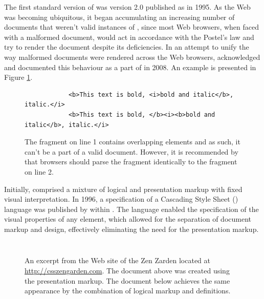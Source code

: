 \documentclass{book}
\begin{document}
        The first standard version of  was version 2.0 published
        as \cite{rfc1866} in 1995. As the Web was becoming ubiquitous, it began
        accumulating an increasing number of documents that weren't valid
        instances of , since most Web browsers, when faced with a
        malformed document, would act in accordance with the Postel's law and
        try to render the document despite its deficiencies. In an attempt to
        unify the way malformed  documents were rendered across
        the Web browsers,  acknowledged and documented this
        behaviour as a part of \cite[Section~8.2, Parsing HTML
        documents]{hickson14} in 2008. An example is presented in Figure
        \ref{fig:overlapping-elements}.

        \begin{figure}[b]
          \begin{verbatim}
            <b>This text is bold, <i>bold and italic</b>, italic.</i>
            <b>This text is bold, </b><i><b>bold and italic</b>, italic.</i>
          \end{verbatim}
          \caption{The fragment on line 1 contains overlapping elements and as
            such, it can't be a part of a valid  document.
            However, it is recommended by  that browsers should
            parse the fragment identically to the fragment on line 2.}
          \label{fig:overlapping-elements}
        \end{figure}

        Initially,  comprised a mixture of logical and
        presentation markup with fixed visual interpretation. In 1996, a
        specification of a Cascading Style Sheet () language was
        published by  within \cite{lie96}. The language enabled
        the specification of the visual properties of any element, which allowed
        for the separation of document markup and design, effectively
        eliminating the need for the presentation markup.

        \begin{figure}
          \inputminted{html}{examples/02/presentation-markup.html}
          \caption{An excerpt from the Web site of the  Zen Zarden
            located at \protect\url{http://csszengarden.com}. The document above
            was created using the  presentation markup. The
            document below achieves the same appearance by the combination of
            logical markup and  definitions.}\medskip
          \inputminted{html}{examples/02/logical-markup.html}
        \end{figure}
\end{document}
